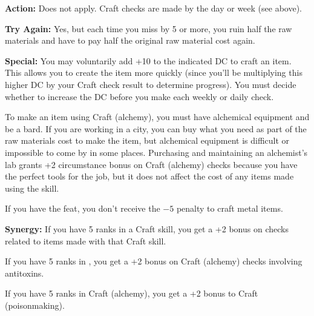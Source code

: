 \textbf{Action:} Does not apply. Craft checks are made by the day or week (see above).

\textbf{Try Again:} Yes, but each time you miss by 5 or more, you ruin half the raw materials and have to pay half the original raw material cost again.

\textbf{Special:} You may voluntarily add +10 to the indicated DC to craft an item. This allows you to create the item more quickly (since you'll be multiplying this higher DC by your Craft check result to determine progress). You must decide whether to increase the DC before you make each weekly or daily check.

To make an item using Craft (alchemy), you must have alchemical equipment and be a bard. If you are working in a city, you can buy what you need as part of the raw materials cost to make the item, but alchemical equipment is difficult or impossible to come by in some places. Purchasing and maintaining an alchemist's lab grants +2 circumstance bonus on Craft (alchemy) checks because you have the perfect tools for the job, but it does not affect the cost of any items made using the skill.

If you have the  feat, you don't receive the $-5$ penalty to craft metal items.

\textbf{Synergy:} If you have 5 ranks in a Craft skill, you get a +2 bonus on  checks related to items made with that Craft skill.

If you have 5 ranks in , you get a +2 bonus on Craft (alchemy) checks involving antitoxins.

If you have 5 ranks in Craft (alchemy), you get a +2 bonus to Craft (poisonmaking).
